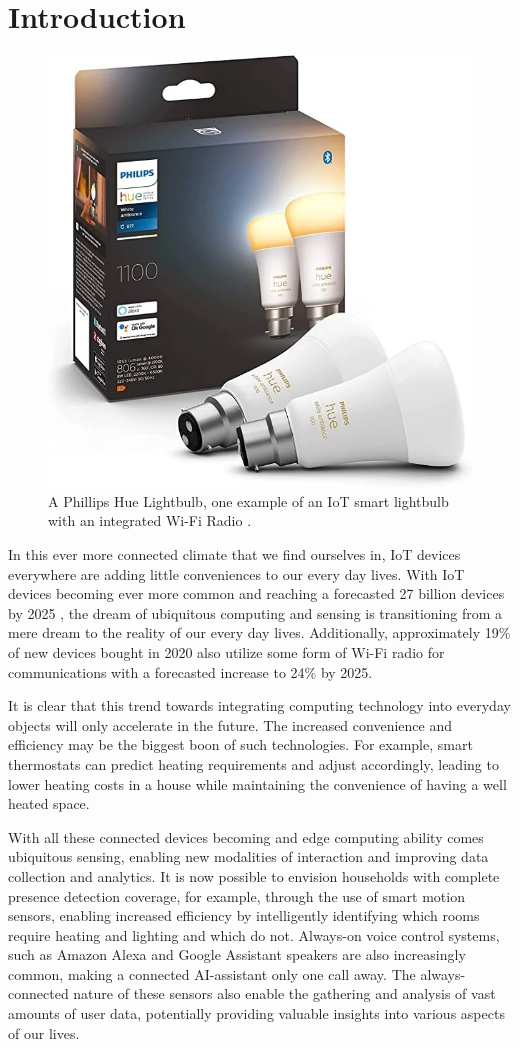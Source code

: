 \chapter{Introduction}\label{chapter:introduction}

\begin{figure}[b]
	\centering
	\includegraphics[width=0.3\linewidth]{figures/phillips_hue}
	\caption{A Phillips Hue Lightbulb, one example of an IoT smart lightbulb with an integrated Wi-Fi Radio \cite{ryles2022now}.}
	\label{fig:phillips-hue-lightbulb}
\end{figure}

In this ever more connected climate that we find ourselves in, IoT devices everywhere are adding little conveniences to our every day lives.
With IoT devices becoming ever more common and reaching a forecasted 27 billion devices by 2025 \cite{hasan2022state}, the dream of ubiquitous computing and sensing is transitioning from a mere dream to the reality of our every day lives.
Additionally, approximately 19\% of new devices bought in 2020 also utilize some form of Wi-Fi radio for communications with a forecasted increase to 24\% by 2025.

It is clear that this trend towards integrating computing technology into everyday objects will only accelerate in the future.
The increased convenience and efficiency may be the biggest boon of such technologies.
For example, smart thermostats can predict heating requirements and adjust accordingly, leading to lower heating costs in a house while maintaining the convenience of having a well heated space.

With all these connected devices becoming and edge computing ability comes ubiquitous sensing, enabling new modalities of interaction and improving data collection and analytics.
It is now possible to envision households with complete presence detection coverage, for example, through the use of smart motion sensors, enabling increased efficiency by intelligently identifying which rooms require heating and lighting and which do not.
Always-on voice control systems, such as Amazon Alexa and Google Assistant speakers are also increasingly common, making a connected AI-assistant only one call away.
The always-connected nature of these sensors also enable the gathering and analysis of vast amounts of user data, potentially providing valuable insights into various aspects of our lives.

